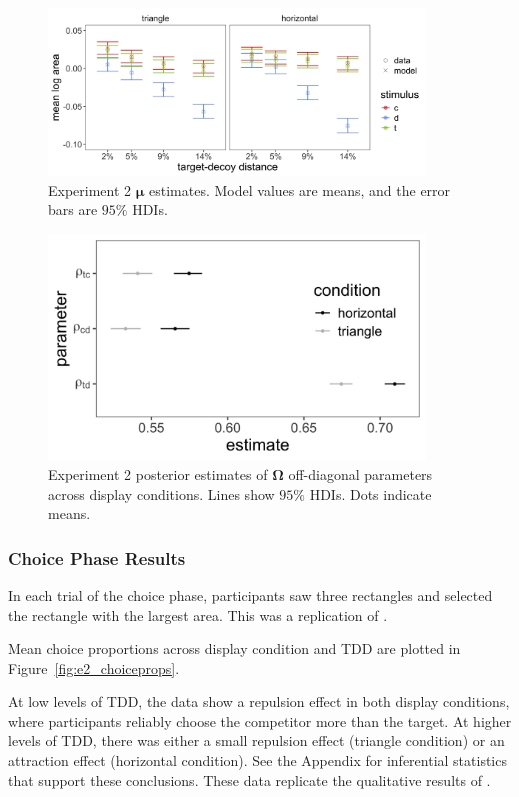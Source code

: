 \begin{figure}
   \includegraphics[width=100mm]{figures/bayes_circle_area_mu_sigma_constant_comp_effect_model_v_data_collapsed.jpeg}
   \caption{Experiment 2 $\boldsymbol{\mu}$ estimates. Model values are means, and the error bars are $95\%$ HDIs.}
   \label{fig:e2mu}
\end{figure}

\begin{figure}
   \includegraphics[width=100mm]{figures/bayes_circle_area_sigma_constant_comp_effect_omega_plot.jpeg}
   \caption{Experiment 2 posterior estimates of $\boldsymbol{\Omega}$ off-diagonal parameters across display conditions. Lines show $95\%$ HDIs. Dots indicate means.}
   \label{fig:e2_omega}
\end{figure}

\subsubsection{Choice Phase Results}

In each trial of the choice phase, participants saw three rectangles and selected the rectangle with the largest area. This was a replication of \textcite{spektorWhenGoodLooks2018b}.

Mean choice proportions across display condition and TDD are plotted in Figure~\ref{fig:e2_choiceprops}. 

At low levels of TDD, the data show a repulsion effect in both display conditions, where participants reliably choose the competitor more than the target. At higher levels of TDD, there was either a small repulsion effect (triangle condition) or an attraction effect  (horizontal condition). See the Appendix for inferential statistics that support these conclusions. These data replicate the qualitative results of \textcite{spektorWhenGoodLooks2018b}.

